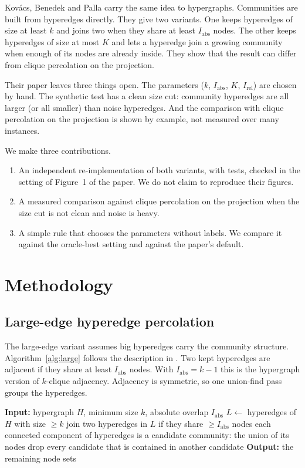 \documentclass[11pt,a4paper]{article}
\newcommand{\Iabs}{I_{\mathrm{abs}}}
\newcommand{\Irel}{I_{\mathrm{rel}}}
\begin{document}
Kov\'acs, Benedek and Palla \cite{kovacs2025} carry the same idea to hypergraphs. Communities are built from hyperedges directly. They give two variants. One keeps hyperedges of size at least $k$ and joins two when they share at least $\Iabs$ nodes. The other keeps hyperedges of size at most $K$ and lets a hyperedge join a growing community when enough of its nodes are already inside. They show that the result can differ from clique percolation on the projection.

Their paper leaves three things open. The parameters ($k$, $\Iabs$, $K$, $\Irel$) are chosen by hand. The synthetic test has a clean size cut: community hyperedges are all larger (or all smaller) than noise hyperedges. And the comparison with clique percolation on the projection is shown by example, not measured over many instances.

We make three contributions.
\begin{enumerate}
\item An independent re-implementation of both variants, with tests, checked in the setting of Figure~1 of the paper. We do not claim to reproduce their figures.
\item A measured comparison against clique percolation on the projection when the size cut is not clean and noise is heavy.
\item A simple rule that chooses the parameters without labels. We compare it against the oracle-best setting and against the paper's default.
\end{enumerate}

\section{Methodology}
\subsection{Large-edge hyperedge percolation}
The large-edge variant assumes big hyperedges carry the community structure. Algorithm~\ref{alg:large} follows the description in \cite{kovacs2025}. Two kept hyperedges are adjacent if they share at least $\Iabs$ nodes. With $\Iabs = k-1$ this is the hypergraph version of $k$-clique adjacency. Adjacency is symmetric, so one union-find pass groups the hyperedges.

\begin{algorithm}[t]
\caption{Large-edge hyperedge percolation}\label{alg:large}
\begin{algorithmic}[1]
\STATE \textbf{Input:} hypergraph $H$, minimum size $k$, absolute overlap $\Iabs$
\STATE $L \leftarrow$ hyperedges of $H$ with size $\ge k$
\STATE join two hyperedges in $L$ if they share $\ge \Iabs$ nodes
\STATE each connected component of hyperedges is a candidate community: the union of its nodes
\STATE drop every candidate that is contained in another candidate
\STATE \textbf{Output:} the remaining node sets
\end{algorithmic}
\end{algorithm}
\end{document}
